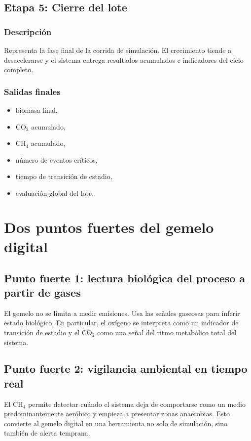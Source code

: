 \documentclass[12pt,a4paper]{report}
\begin{document}
\section{Etapa 5: Cierre del lote}

\subsection*{Descripción}
Representa la fase final de la corrida de simulación. El crecimiento tiende a desacelerarse y el sistema entrega resultados acumulados e indicadores del ciclo completo.

\subsection*{Salidas finales}
\begin{itemize}[leftmargin=0.7cm]
    \item biomasa final,
    \item CO$_2$ acumulado,
    \item CH$_4$ acumulado,
    \item número de eventos críticos,
    \item tiempo de transición de estadio,
    \item evaluación global del lote.
\end{itemize}

\chapter{Dos puntos fuertes del gemelo digital}

\section{Punto fuerte 1: lectura biológica del proceso a partir de gases}

El gemelo no se limita a medir emisiones. Usa las señales gaseosas para inferir estado biológico. En particular, el oxígeno se interpreta como un indicador de transición de estadio y el CO$_2$ como una señal del ritmo metabólico total del sistema.

\section{Punto fuerte 2: vigilancia ambiental en tiempo real}

El CH$_4$ permite detectar cuándo el sistema deja de comportarse como un medio predominantemente aeróbico y empieza a presentar zonas anaerobias. Esto convierte al gemelo digital en una herramienta no solo de simulación, sino también de alerta temprana.
\end{document}
